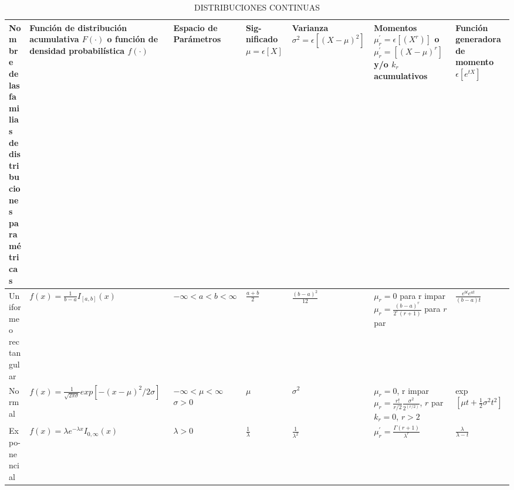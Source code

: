 \begin{table}[ht!]
     \centering
     \caption{DISTRIBUCIONES CONTINUAS \\ } 
     \hspace*{-4.9cm}\begin{tabular}{|p{1.5cm}|p{5.12cm}|p{2.13cm}|p{1.8cm}|p{2.13cm}|p{4cm}|p{2cm}|}
        Nombre de las familias de distribuciones paramétricas & 
        Función de distribución acumulativa $F(\cdot)$ o función de densidad probabilística $f(\cdot)$ & Espacio de Parámetros & 
        Sig-nificado  $\mu=\epsilon[X]$& 
        Varianza $\sigma^2=\epsilon[(X-\mu)^2]$ & 
        Momentos $\mu_r^{'}=\epsilon[(X^r)]$ o $\mu_r^{'}=[(X-\mu)^r]$ y/o $k_r$ acumulativos & 
        Función generadora de momento $\epsilon[e^{tX}]$\\ 
        \hline
         
        Uniforme o rectangular &
        $f(x)=\frac{1}{b-a}I_{[a,b]}(x)$  &
        $-\infty<a<b<\infty$  &
        $\frac{a+b}{2}$ &
        $\frac{(b-a)^2}{12}$ &
        \Longunderstack{
        $\mu_r = 0$ para r impar \\ \\
        $\mu_r = \frac{(b-a)^r}{2^r(r+1)}$ para $r$ par
        \\}& 
        $\frac{e^{bt}e^{at}}{(b-a)t}$ 
        \\ 
        \hline
        
        Normal &
        $f(x) = \frac{1}{\sqrt{2\pi\sigma}}exp[-(x-\mu)^2 /2\sigma]$ &
        \Longunderstack{
        $-\infty<\mu<\infty$\\ \\
        $\sigma>0$
        \\}& 
        $\mu$ &
        $\sigma^2$ &
        \Longunderstack{
        $\mu_r = 0$, r impar \\ \\
        $\mu_r = \frac{r!}{r/2}\frac{\sigma^2}{2^(r/2)}$, $r$ par \\ \\ $k_r = 0$, $r>2$
        \\} &
        exp$[\mu t+\frac{1}{2}\sigma^2t^2]$
        \\ \hline
        
        Expo-nencial &
        $f(x) =\lambda e^{-\lambda x}I_{0,\infty}(x)$ &
        $\lambda > 0$ &
        $\frac{1}{\lambda}$ &
        $\frac{1}{\lambda^2}$ &
        $\mu_r^{'} = \frac{\Gamma(r+1)}{\lambda^r}$ &
        $\frac{\lambda}{\lambda - t}$
        \\ \hline
        

\end{tabular}
\end{table}
